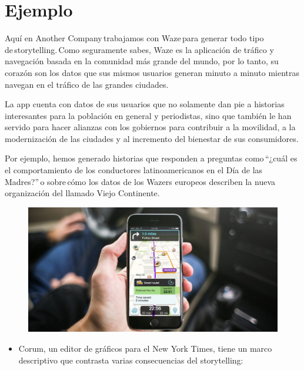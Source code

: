 {{\begin{itemize}
	\end{itemize} 

\section{Ejemplo}

\item{Aquí en Another Company trabajamos con Waze para generar todo tipo de storytelling. Como seguramente sabes, Waze es la aplicación de tráfico y navegación basada en la comunidad más grande del mundo, por lo tanto, su corazón son los datos que sus mismos usuarios generan minuto a minuto mientras navegan en el tráfico de las grandes ciudades. 

La app cuenta con datos de sus usuarios que no solamente dan pie a historias interesantes para la población en general y periodistas, sino que también le han servido para hacer alianzas con los gobiernos para contribuir a la movilidad, a la modernización de las ciudades y al incremento del bienestar de sus consumidores. 

Por ejemplo, hemos generado historias que responden a preguntas como “¿cuál es el comportamiento de los conductores latinoamericanos en el Día de las Madres?” o sobre cómo los datos de los Wazers europeos describen la nueva organización del llamado Viejo Continente. }

\begin{figure}[htb]
\begin{center}
\includegraphics[width=15cm]{./Imagenes/waze2}
\end{center}
\end{figure}


\begin{itemize}
\item  Corum, un editor de gráficos para el New York Times, tiene un marco descriptivo que contrasta varias consecuencias del storytelling:


\end{itemize}}}
